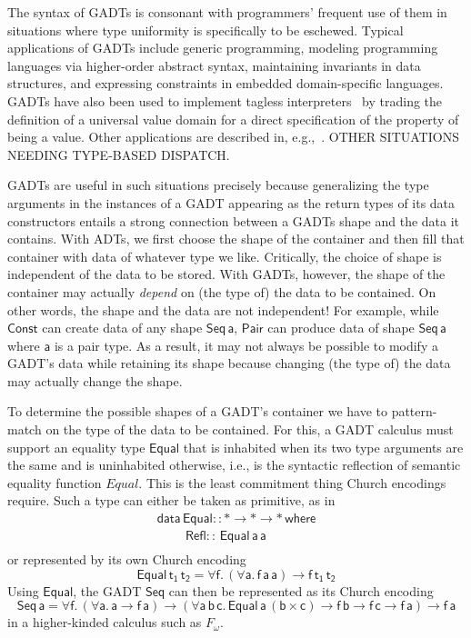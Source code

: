 \documentclass[acmsmall,screen,review,anonymous]{acmart}
\theoremstyle{definition}
\begin{document}
The syntax of GADTs is consonant with programmers' frequent use of
them in situations where type uniformity is specifically to be
eschewed.  {\color{blue} Typical applications of GADTs include generic
  programming, modeling programming languages via higher-order
  abstract syntax, maintaining invariants in data structures, and
  expressing constraints in embedded domain-specific languages. GADTs
  have also been used to implement tagless
  interpreters~\cite{pl04,pr06,pvww06} by trading the definition of a
  universal value domain for a direct specification of the property of
  being a value. Other applications are described in,
  e.g.,~\cite{js15,rou06,MORE,UPDATED}. OTHER SITUATIONS NEEDING
  TYPE-BASED DISPATCH.}

GADTs are useful in such situations precisely because generalizing the
type arguments in the instances of a GADT appearing as the return
types of its data constructors entails a strong connection between a
GADTs shape and the data it contains.  With ADTs, we first choose the
shape of the container and then fill that container with data of
whatever type we like. Critically, the choice of shape is independent
of the data to be stored. With GADTs, however, the shape of the
container may actually {\em depend} on (the type of) the data to be
contained. On other words, the shape and the data are not independent!
For example, while $\mathsf{Const}$ can create data of any shape
$\mathsf{Seq\,a}$, $\mathsf{Pair}$ can produce data of shape
$\mathsf{Seq\,a}$ where $\mathsf{a}$ is a pair type. As a result, it
may not always be possible to modify a GADT's data while retaining its
shape because changing (the type of) the data may actually change the
shape.

To determine the possible shapes of a GADT's container we have to
pattern-match on the type of the data to be contained. For this, a
GADT calculus must support an equality type $\mathsf{Equal}$ that is
inhabited when its two type arguments are the same and is uninhabited
otherwise, i.e., is the syntactic reflection of semantic equality
function $\mathit{Equal}$. {\color{blue} This is the least commitment
  thing Church encodings require.} Such a type can either be taken as
primitive, as in
\[\begin{array}{l}
\mathsf{data\, Equal :: * \to * \to *\,where}\\
\mathsf{\;\;\;\;\;\;\;\;Refl ::\, Equal\,a\,a}\\
\end{array}\]
\noindent
or
represented by its own Church encoding
\[\mathsf{Equal\,t_1\,t_2} = \mathsf{\forall f.\, (\forall a.\,
  f\,a\,a) \to f\,t_1\,t_2}\] Using $\mathsf{Equal}$, the GADT
$\mathsf{Seq}$ can then be represented as its Church encoding
\[\mathsf{Seq\,a} = \mathsf{\forall f.\, (\forall a.\,a \to f\, a)
  \to (\forall a\,b\,c.\,Equal\,a\,(b\times c) \to f\,b \to f\,c \to
  f\,a) \to f\,a}\]
in a higher-kinded calculus such as $F_\omega$.
\end{document}
